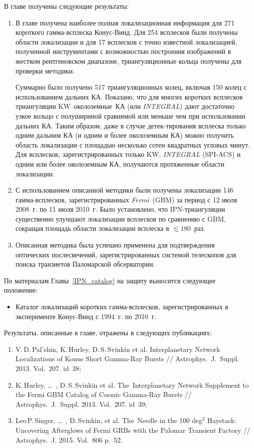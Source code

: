 \FloatBarrier

В главе получены следующие результаты:
\begin{enumerate}
\item В главе получена наиболее полная локализационная информация для 271 короткого 
гамма-всплеска Конус-Винд. Для 254 всплесков были получены области локализации и 
для 17 всплесков с точно известной локализацией, полученной инструментами с 
возможностью построения изображений в жестком рентгеновском диапазоне, триангуляционные
кольца получены для проверки методики.

Суммарно было получено 517 триангуляционных колец, включая 150 колец с использованием 
дальних КА. Показано, что для многих коротких всплесков триангуляции 
KW--околоземные~КА (или \textit{INTEGRAL}) дают достаточно узкое кольцо 
с полушириной сравнимой или меньше чем при использовании дальних КА. Таким образом, 
даже в случае детек-тирования всплеска только одним дальним КА (и одним и более 
околоземным КА) можно получить область локализации с площадью несколько 
сотен квадратных угловых минут. Для всплесков, зарегистрированных только KW, 
\textit{INTEGRAL} (SPI-ACS) и одним или более околоземным КА, получаются 
протяженные области локализации.

\item С использованием описанной методики были получены локализации 146 гамма-всплесков,
зарегистрированных \textit{Fermi}~(GBM) за период с 12 июля 2008~г. по 11 июля 2010~г.
Было установлено, что IPN-триангуляции существенно улучшают локализации всплесков 
по сравнению с GBM, сокращая площадь области локализации всплеска в $\lesssim 180$~раз. 

\item Описанная методика была успешно применена для подтверждения оптических послесвечений,
зарегистрированных системой телескопов для поиска транзиетов Паломарской обсерватории.
\end{enumerate}

По материалам Главы~\ref{IPN_catalog} на защиту выносится следующее положение:
\begin{itemize}
\item Каталог локализаций коротких гамма-всплесков, зарегистрированных в эксперименте
    Конус-Винд с 1994~г. по 2010~г.
\end{itemize}

Результаты, описанные в главе, отражены в следующих публикациях:
\begin{enumerate}
\item V.\,D.\,Pal'shin, K.\,Hurley, D.\,S.\,Svinkin et al. Interplanetary Network Localizations of
Konus Short Gamma-Ray Bursts // Astrophys.~J.~Suppl. 2013. Vol.~207. id~38;
\item K.\,Hurley, \dots\ , D.\,S.\,Svinkin et al. The~Interplanetary Network Supplement to 
the Fermi GBM Catalog of Cosmic Gamma-Ray Bursts // Astrophys.~J.~Suppl. 2013. Vol.~207. id~39;
\item Leo\,P.\,Singer, \dots\ , D.\,Svinkin, et al. The~Needle in the 100 deg$^2$ Haystack: 
Uncovering Afterglows of Fermi GRBs with the Palomar Transient Factory // 
Astrophys.~J. 2015. Vol.~806 p.~52.
\end{enumerate}


\clearpage